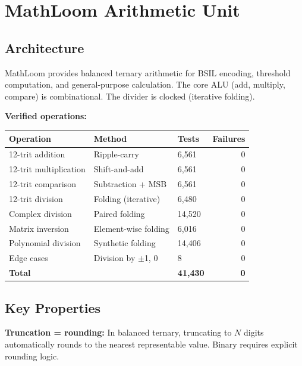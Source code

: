 \documentclass[11pt, a4paper]{article}
\begin{document}
\section{MathLoom Arithmetic Unit}

\subsection{Architecture}

MathLoom provides balanced ternary arithmetic for BSIL encoding,
threshold computation, and general-purpose calculation. The core
ALU (add, multiply, compare) is combinational. The divider is
clocked (iterative folding).

\textbf{Verified operations:}
\begin{center}
\begin{tabular}{@{}lllr@{}}
\toprule
\textbf{Operation} & \textbf{Method} & \textbf{Tests} & \textbf{Failures} \\
\midrule
12-trit addition     & Ripple-carry          & 6,561  & 0 \\
12-trit multiplication & Shift-and-add       & 6,561  & 0 \\
12-trit comparison   & Subtraction + MSB     & 6,561  & 0 \\
12-trit division     & Folding (iterative)   & 6,480  & 0 \\
Complex division     & Paired folding        & 14,520 & 0 \\
Matrix inversion     & Element-wise folding  & 6,016  & 0 \\
Polynomial division  & Synthetic folding     & 14,406 & 0 \\
Edge cases           & Division by $\pm$1, 0 & 8      & 0 \\
\midrule
\textbf{Total}       &                       & \textbf{41,430} & \textbf{0} \\
\bottomrule
\end{tabular}
\end{center}

\subsection{Key Properties}

\textbf{Truncation = rounding:} In balanced ternary, truncating
to $N$ digits automatically rounds to the nearest representable
value. Binary requires explicit rounding logic.
\end{document}
